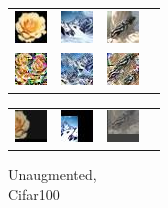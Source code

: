 \begingroup
\setlength{\tabcolsep}{2pt}
\begin{figure}[h]
    \captionsetup{justification=centering}
    \begin{subtable}{.25\linewidth}
        \centering
        {\begin{tabular}{ l l l l }
             \includegraphics[width = 24pt]{repimages/ori_21_unaugmented.jpg} & \includegraphics[width = 24pt]{repimages/ori_22_unaugmented.jpg}  & \includegraphics[width = 24pt]{repimages/ori_98_unaugmented.jpg} \\
             \includegraphics[width = 24pt]{repimages/rec_21_unaugmented.jpg} & \includegraphics[width = 24pt]{repimages/rec_22_unaugmented.jpg}  & \includegraphics[width = 24pt]{repimages/rec_98_unaugmented.jpg}  &   \\
        \end{tabular}}
        \caption{Unaugmented, \\ Cifar100}%
    \end{subtable}%
    \hfill
    \begin{subtable}{.25\linewidth}
        \centering
        {\begin{tabular}{ l l l l }
             \includegraphics[width = 24pt]{repimages/ori_21_hybrid.jpg} & \includegraphics[width = 24pt]{repimages/ori_22_hybrid.jpg}  & \includegraphics[width = 24pt]{repimages/ori_98_hybrid.jpg} \\

\end{tabular}}
\end{subtable}
\end{figure}
